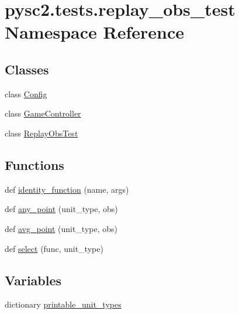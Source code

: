 \hypertarget{namespacepysc2_1_1tests_1_1replay__obs__test}{}\section{pysc2.\+tests.\+replay\+\_\+obs\+\_\+test Namespace Reference}
\label{namespacepysc2_1_1tests_1_1replay__obs__test}
\subsection*{Classes}
\begin{DoxyCompactItemize}
\item 
class \mbox{\hyperlink{classpysc2_1_1tests_1_1replay__obs__test_1_1_config}{Config}}
\item 
class \mbox{\hyperlink{classpysc2_1_1tests_1_1replay__obs__test_1_1_game_controller}{Game\+Controller}}
\item 
class \mbox{\hyperlink{classpysc2_1_1tests_1_1replay__obs__test_1_1_replay_obs_test}{Replay\+Obs\+Test}}
\end{DoxyCompactItemize}
\subsection*{Functions}
\begin{DoxyCompactItemize}
\item 
def \mbox{\hyperlink{namespacepysc2_1_1tests_1_1replay__obs__test_af1cc750e316025995965c17685a2d2df}{identity\+\_\+function}} (name, args)
\item 
def \mbox{\hyperlink{namespacepysc2_1_1tests_1_1replay__obs__test_a473c3acd9dcebe3d314c5311d81424af}{any\+\_\+point}} (unit\+\_\+type, obs)
\item 
def \mbox{\hyperlink{namespacepysc2_1_1tests_1_1replay__obs__test_abf760c8b64b088576c2a1ac3888e8d90}{avg\+\_\+point}} (unit\+\_\+type, obs)
\item 
def \mbox{\hyperlink{namespacepysc2_1_1tests_1_1replay__obs__test_a94272f64f4f32513e4e86e680cd4ef4c}{select}} (func, unit\+\_\+type)
\end{DoxyCompactItemize}
\subsection*{Variables}
\begin{DoxyCompactItemize}
\item 
dictionary \mbox{\hyperlink{namespacepysc2_1_1tests_1_1replay__obs__test_aa910b5c6f5e70efcba9a20c60ce3af22}{printable\+\_\+unit\+\_\+types}}
\end{DoxyCompactItemize}


